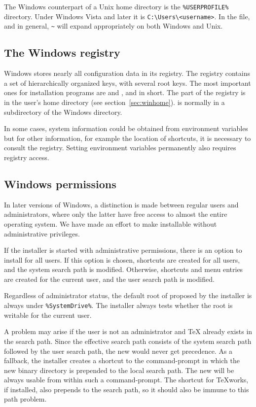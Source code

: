 \documentclass{article}
\begin{document}
The Windows counterpart of a Unix home directory is the
\verb|%USERPROFILE%| directory.  Under Windows Vista and later it is
\verb|C:\Users\<username>|.  In the
 file, and \KPS{} in general, \verb|~| will
expand appropriately on both Windows and Unix.


\subsection{The Windows registry}
\label{sec:registry}

Windows stores nearly all configuration data in its registry.  The
registry contains a set of hierarchically organized keys, with several
root keys. The most important ones for installation programs are
 and ,  and
 in short. The  part of the registry is in the
user's home directory (see section~\ref{sec:winhome}).   is
normally in a subdirectory of the Windows directory.

In some cases, system information could be obtained from environment
variables but for other information, for example the location of
shortcuts, it is necessary to consult the registry.  Setting environment
variables permanently also requires registry access.


\subsection{Windows permissions}
\label{sec:winpermissions}

In later versions of Windows, a distinction is made between regular
users and administrators, where only the latter have free access to almost the
entire operating system. We have made an effort to make \TL{}
installable without administrative privileges.

If the installer is started with administrative permissions, there is an
option to install for all users.  If this option is chosen, shortcuts
are created for all users, and the system search path is
modified. Otherwise, shortcuts and menu entries are created for the
current user, and the user search path is modified.

Regardless of administrator status, the default root of \TL{} proposed
by the installer is always under \verb|%SystemDrive%|. The installer
always tests whether the root is writable for the current user.

A problem may arise if the user is not an administrator and \TeX{}
already exists in the search path.  Since the effective search path
consists of the system search path followed by the user search path, the
new \TL{} would never get precedence.  As a fallback, the installer
creates a shortcut to the command-prompt in which the new \TL{} binary
directory is prepended to the local search path.  The new \TL{} will be
always usable from within such a command-prompt. The shortcut for
\TeX{}works, if installed, also prepends \TL{} to the search path, so it
should also be immune to this path problem.
\end{document}
